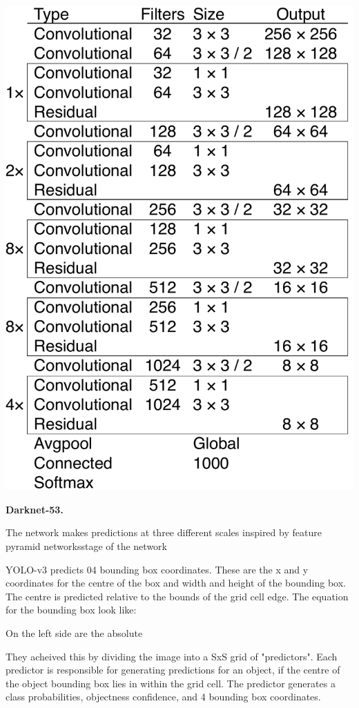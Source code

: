 \documentclass[10pt,twocolumn,letterpaper]{article}
\begin{document}
\begin{table}[h] 
\begin{center}
\includegraphics[width=.8\linewidth]{arch2.pdf}
\end{center}
\caption{\small \textbf{Darknet-53.}}
\label{network_architecture}
\end{table}

The network makes predictions at three different scales inspired by feature pyramid networksstage of the network


YOLO-v3 predicts 04 bounding box coordinates. These are the x and y coordinates for the centre of the box and width and height of the bounding box. The centre is predicted relative to the bounds of the grid cell edge. The equation for the bounding box look like:

On the left side are the absolute

They acheived this by dividing the image into a SxS grid of "predictors". Each predictor is responsible for generating predictions for an object, if the centre of the object bounding box lies in within the grid cell. The predictor generates a class probabilities, objectness confidence,
and 4 bounding box coordinates.
\end{document}
